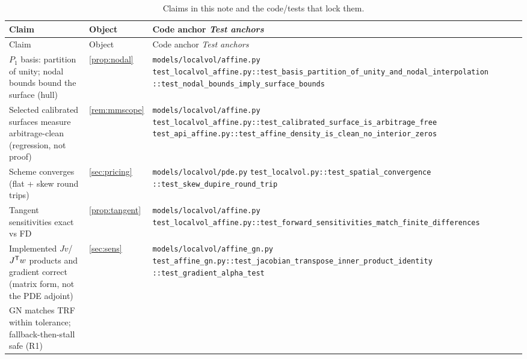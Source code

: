 \documentclass[11pt]{article}
\begin{document}
\begingroup
\small
\setlength{\tabcolsep}{4pt}
\renewcommand{\arraystretch}{1.15}
\begin{longtable}{@{}p{}p{}p{}@{}}
\caption{Claims in this note and the code/tests that lock them.}\\
\toprule Claim & Object & Code anchor \newline \emph{Test anchors}\\ \midrule
\endfirsthead
\toprule Claim & Object & Code anchor \newline \emph{Test anchors}\\ \midrule
\endhead
$P_1$ basis: partition of unity; nodal bounds bound the surface (hull) &
\cref{prop:nodal} &
\nolinkurl{models/localvol/affine.py}\newline
\nolinkurl{test_localvol_affine.py::test_basis_partition_of_unity_and_nodal_interpolation}\newline
\nolinkurl{::test_nodal_bounds_imply_surface_bounds}\\
\addlinespace
Selected calibrated surfaces measure arbitrage-clean (regression, not
proof) &
\cref{rem:mmscope} &
\nolinkurl{models/localvol/affine.py}\newline
\nolinkurl{test_localvol_affine.py::test_calibrated_surface_is_arbitrage_free}\newline
\nolinkurl{test_api_affine.py::test_affine_density_is_clean_no_interior_zeros}\\
\addlinespace
Scheme converges (flat + skew round trips) &
\cref{sec:pricing} &
\nolinkurl{models/localvol/pde.py}\newline
\nolinkurl{test_localvol.py::test_spatial_convergence}\newline
\nolinkurl{::test_skew_dupire_round_trip}\\
\addlinespace
Tangent sensitivities exact vs FD &
\cref{prop:tangent} &
\nolinkurl{models/localvol/affine.py}\newline
\nolinkurl{test_localvol_affine.py::test_forward_sensitivities_match_finite_differences}\\
\addlinespace
Implemented $Jv$/$J^{\mathsf{T}} w$ products and gradient correct (matrix form, not
the PDE adjoint) &
\cref{sec:sens} &
\nolinkurl{models/localvol/affine_gn.py}\newline
\nolinkurl{test_affine_gn.py::test_jacobian_transpose_inner_product_identity}\newline
\nolinkurl{::test_gradient_alpha_test}\\
\addlinespace
GN matches TRF within tolerance; fallback-then-stall safe (R1) &

\end{longtable}
\end{document}
